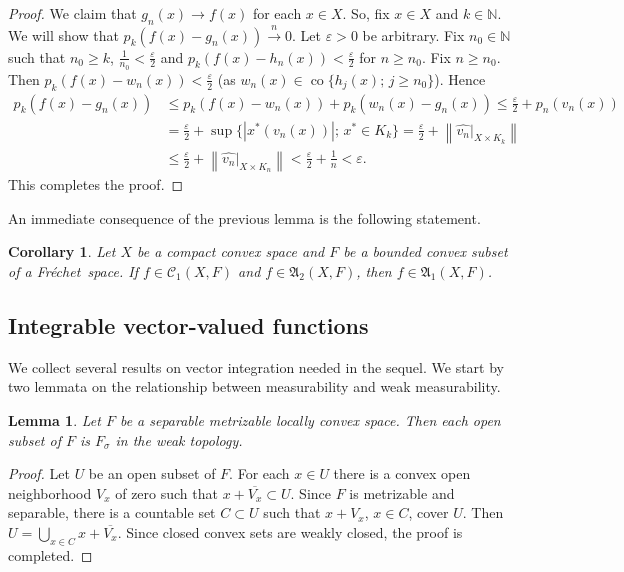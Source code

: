 \documentclass{amsart}
\numberwithin{equation}{section}
\newtheorem{lemma}[thm]{Lemma}
\newtheorem{cor}[thm]{Corollary}
\theoremstyle{definition}
\def\fra{\mathfrak{A}}
\def\C{\mathcal C}
\def\co{\operatorname{co}}
\def\en{\mathbb N}
\def\r{|}
\newcommand{\norm}[1]{\left\|#1\right\|}
\newcommand{\abs}[1]{\left| #1  \right|}
\newcommand{\setsep}{;\,}
\newcommand{\fr}{Fr\'echet\ }
\begin{document}
\begin{proof}
We claim that $g_n(x)\to f(x)$ for each $x\in X$. So, fix $x\in X$ and $k\in \en$. We will show that $p_k(f(x)-g_n(x))\overset{n}{\longrightarrow} 0$.
Let $\varepsilon>0$ be arbitrary. Fix $n_0\in\en$ such that $n_0\ge k$, $\frac{1}{n_0}<\frac\varepsilon2$ and
	 $p_k(f(x)-h_n(x))<\frac\varepsilon2$ for $n\ge n_0$. Fix $n\ge n_0$. Then $p_k(f(x)-w_n(x))<\frac\varepsilon2$ 
	 (as $w_n(x)\in\co\{h_j(x)\setsep j\ge n_0\}$). Hence
$$\begin{aligned}p_k(f(x)-g_n(x))&\le p_k(f(x)-w_n(x))+p_k(w_n(x)-g_n(x)) \le \frac\varepsilon2 + p_n(v_n(x))
\\&=\frac\varepsilon2+\sup\{\abs{x^*(v_n(x))}\setsep x^*\in K_k\} 
=\frac\varepsilon2+\norm{\widehat{v_n}\r_{X\times K_k}}
\\&\le\frac\varepsilon2+\norm{\widehat{v_n}\r_{X\times K_n}} <\frac\varepsilon2+\frac1n<\varepsilon.\end{aligned}$$
This completes the proof.
\end{proof}

An immediate consequence of the previous lemma is the following statement.

\begin{cor}\label{C:c21} Let $X$ be a compact convex space and $F$ be a bounded convex subset of a \fr space.
If $f\in\C_1(X,F)$ and $f\in\fra_2(X,F)$, then $f\in \fra_1(X,F)$.
\end{cor}

\subsection{Integrable vector-valued functions}
We collect several results on vector integration needed in the sequel. We start by two lemmata on the relationship
between measurability and weak measurability.

\begin{lemma}
\label{L:meas-0}
Let $F$ be a separable metrizable locally convex space. Then each open subset of $F$ is $F_\sigma$ in the weak topology.
\end{lemma}

\begin{proof}
Let $U$ be an open subset of $F$. For each $x\in U$ there is a convex open neighborhood $V_x$ of zero such that $x+\overline{V_x}\subset U$.
Since $F$ is metrizable and separable, there is a countable set $C\subset U$ such that $x+V_x$, $x\in C$, cover $U$. Then $U=\bigcup_{x\in C}x+\overline{V_x}$.
Since closed convex sets are weakly closed, the proof is completed.
\end{proof}
\end{document}
